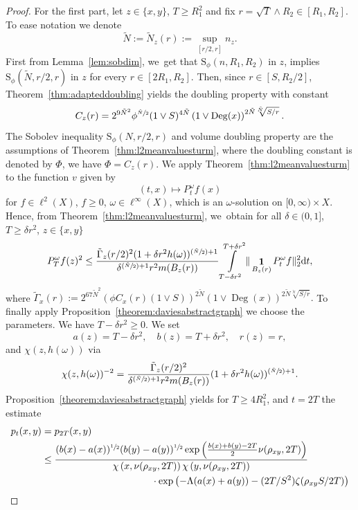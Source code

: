 \documentclass[JEP,XML,SOM,Unicode,published]{cedram}
\newcommand{\Psfrac}[2]{(\sfrac{#1}{#2})}
\newcommand{\rS}{\mathrm{S}}
\theoremstyle{plain}
\theoremstyle{definition}
\newcommand{\drm}{\mathrm{d}}
\DeclareMathOperator{\Deg}{Deg}
\DeclareMathOperator{\Eins}{\mathbf{1}}
\let\oldint\int
\renewcommand{\int}{\oldint\limits}
\begin{document}
\begin{proof}
For the first part, let $z\in\{x,y\}$, $ T\ge R_{1}^{2} $ and fix $ r=\sqrt{T}\wedge R_2 \in [R_{1},R_{2}] $.
To ease notation we denote
\[
\tilde N:=\tilde N_{z}(r):={\sup_{[r/2,r]}n_z.}
\]
First from Lemma~\ref{lem:sobdim}, we~get that $\rS_\phi (n,R_1,R_2)$ in $z$, implies $\rS_{\phi} (\tilde N, r/2,r)$ in $z$ for every $ r\in[2R_1,R_2] $.
Then, since $r\in[S,R_2/2]$, Theorem~\ref{thm:adapteddoubling} yields the doubling property with constant
\[
C_z(r)=2^{9 \tilde N^2}\phi^{\sfrac{\tilde N}{2}}(1\vee S)^{4\tilde N}\left(1\vee\Deg(x)\right)^{2\tilde N\sqrt[\tilde N]{S/r}}.
\]
The Sobolev inequality $\rS_{{\phi}}(N,r/2,r)$ and volume doubling property are the assumptions of Theorem~\ref{thm:l2meanvaluesturm}, where the doubling constant is denoted by $\Phi $, \ie we have $ \Phi=C_{z}(r) $. We apply Theorem~\ref{thm:l2meanvaluesturm} to the function $ v $ given by
\[
(t,x)\mapsto P^\omega_t f(x)
\]
for $f\in \ell^2(X)$, $f\geq 0$, $\omega\in\ell^\infty(X)$, which is an $\omega$-solution on $[0,\infty)\times X$. Hence, from Theorem~\ref{thm:l2meanvaluesturm}, we~obtain
for all $\delta\in(0,1]$, $T\geq \delta r^2$, $z\in\{x,y\}$
\begin{align*}
P_T^\omega f(z)^2
\leq
\frac{\tilde\Gamma_{z}(r/2)^2(1+\delta r^2h(\omega))^{\Psfrac{\tilde N}{2}+1}}{\delta^{\Psfrac{\tilde N}2+1}r^2m(B_{z}(r))}
\int\limits_{T-\delta r^2}^{T+\delta r^2}\Vert\Eins_{B_{z}(r)} P_t^\omega f\Vert_2^{2}\drm t,
\end{align*}
where $
\tilde\Gamma_x(r)
:=
2^{67\tilde N^2}(\phi C_{x}(r)(1\vee S))^{2\tilde N}
\left(1\vee\Deg(x)
\right)
^{2\tilde N\sqrt[\tilde N]{{S}/{r}}}. $
To finally apply
Proposition~\ref{theorem:daviesabstractgraph} we choose the parameters.
We have $T-\delta r^2\geq 0$. We set
\[
a(z)=T-\delta r^2,\quad b(z)=T+\delta r^2,\quad
r(z)=r,
\]
and $\chi(z, h(\omega))$ via
\[
\chi(z,h(\omega))^{-2}=\frac{\tilde\Gamma_{z} (r/2)^2}{\delta^{\Psfrac{\tilde N}2+1}r^{2}
m(B_{z}(r))}(1+\delta r^2h(\omega))^{\Psfrac{\tilde N}{2}+1}.
\]
Proposition~\ref{theorem:daviesabstractgraph} yields
for $T\geq 4R_1^2$, and $ t=2T $
the estimate
\begin{align*}
p_{t}(x,y)&=p_{2T}(x,y)
\\&
\leq \frac
{
(b(x)-a(x))^{\sfrac{1}{2}}(b(y)-a(y))^{\sfrac{1}{2}}
\exp\left(\frac{b(x)+b(y)-2T}{2}\nu(\rho_{xy},2T)\right)
}
{\chi\left(x,\nu(\rho_{xy},2T)\right)\chi\left(y,\nu(\rho_{xy},2T)\right)}
\\
&\hspace*{4cm} \cdot\exp\left(-\Lambda(a(x)+a(y))-(2T/S^2)\zeta(\rho_{xy}S/2T)\right)

\end{align*}
\end{proof}
\end{document}
